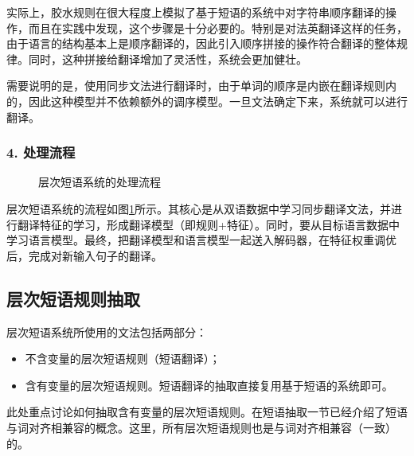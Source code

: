 \parinterval 实际上，胶水规则在很大程度上模拟了基于短语的系统中对字符串顺序翻译的操作，而且在实践中发现，这个步骤是十分必要的。特别是对法英翻译这样的任务，由于语言的结构基本上是顺序翻译的，因此引入顺序拼接的操作符合翻译的整体规律。同时，这种拼接给翻译增加了灵活性，系统会更加健壮。

\parinterval 需要说明的是，使用同步文法进行翻译时，由于单词的顺序是内嵌在翻译规则内的，因此这种模型并不依赖额外的调序模型。一旦文法确定下来，系统就可以进行翻译。


\subsubsection{4. 处理流程}
\begin{figure}[htp]
\centering

\caption{层次短语系统的处理流程}
\label{fig:8-6}
\end{figure}

\parinterval 层次短语系统的流程如图\ref{fig:8-6}所示。其核心是从双语数据中学习同步翻译文法，并进行翻译特征的学习，形成翻译模型（即规则+特征）。同时，要从目标语言数据中学习语言模型。最终，把翻译模型和语言模型一起送入解码器，在特征权重调优后，完成对新输入句子的翻译。


\subsection{层次短语规则抽取}

\parinterval 层次短语系统所使用的文法包括两部分：
\begin{itemize}
\vspace{0.5em}
\item 不含变量的层次短语规则（短语翻译）；
\vspace{0.5em}
\item 含有变量的层次短语规则。短语翻译的抽取直接复用基于短语的系统即可。
\vspace{0.5em}
\end{itemize}
\parinterval 此处重点讨论如何抽取含有变量的层次短语规则。在{\chapterseven}短语抽取一节已经介绍了短语与词对齐相兼容的概念。这里，所有层次短语规则也是与词对齐相兼容（一致）的。


